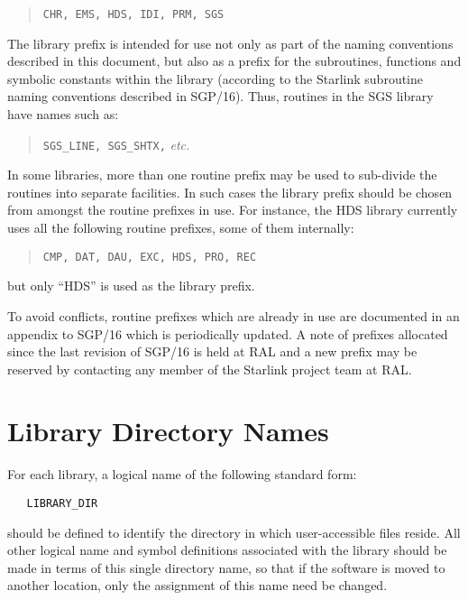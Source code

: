 \begin{quote}
\begin{center}
{\tt CHR, EMS, HDS, IDI, PRM, SGS}
\end{center}
\end{quote}

The library prefix is intended for use not only as part of the naming
conventions described in this document, but also as a prefix for the
subroutines, functions and symbolic constants within the library (according
to the Starlink subroutine naming conventions described in SGP/16). 
Thus, routines in the SGS library have names such as:

\begin{quote}
\begin{center}
{\tt SGS\_LINE, SGS\_SHTX,} {\em etc.}
\end{center}
\end{quote}

In some libraries, more than one routine prefix may be used to sub-divide
the routines into separate facilities. 
In such cases the library prefix should be chosen from amongst the 
routine prefixes in use.
For instance, the HDS library currently uses all the following routine prefixes,
some of them internally: 

\begin{quote}
\begin{center}
{\tt CMP, DAT, DAU, EXC, HDS, PRO, REC}
\end{center}
\end{quote}

but only ``HDS'' is used as the library prefix.

To avoid conflicts, routine prefixes which are already in use are documented
in an appendix to SGP/16 which is periodically updated. 
A note of prefixes allocated since the last revision of SGP/16 is held at
RAL and a new prefix may be reserved by contacting any member of the
Starlink project team at RAL. 

\section{Library Directory Names}

For each library, a logical name of the following standard form:

\begin{verbatim}
   LIBRARY_DIR
\end{verbatim}

should be defined to identify the directory in which user-accessible files
reside. 
All other logical name and symbol definitions associated with the library
should be made in terms of this single directory name, so that if the
software is moved to another location, only the assignment of this name need
be changed. 


